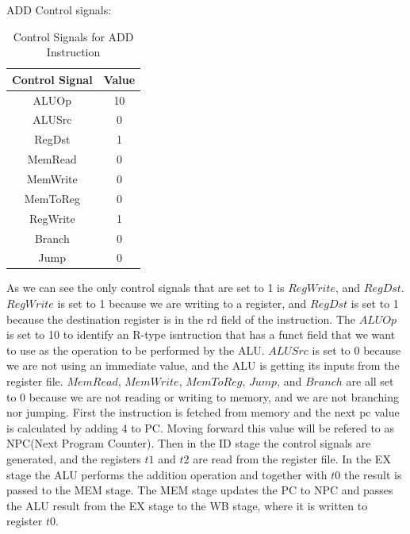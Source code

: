 ADD Control signals:
\begin{table}[H]
    \centering
    \begin{tabular}{|c|c|}
    \hline
    \textbf{Control Signal} & \textbf{Value} \\ \hline
    ALUOp                   & 10             \\ \hline
    ALUSrc                  & 0             \\ \hline
    RegDst                  & 1             \\ \hline
    MemRead                 & 0             \\ \hline
    MemWrite                & 0             \\ \hline
    MemToReg                & 0             \\ \hline
    RegWrite                & 1             \\ \hline
    Branch                  & 0             \\ \hline
    Jump                 & 0             \\ \hline
    \end{tabular}
    \caption{Control Signals for ADD Instruction}
    \label{tab:add_control_signals}
\end{table}

As we can see the only control signals that are set to 1 is $RegWrite$, and $RegDst$. $RegWrite$ is set to 1 because we are writing to a register, and $RegDst$ is set to 1 because the destination register is in the rd field of the instruction. The $ALUOp$ is set to 10 to identify an R-type isntruction that has a funct field that we want to use as the operation to be performed by the ALU. $ALUSrc$ is set to 0 because we are not using an immediate value, and the ALU is getting its inputs from the register file. $MemRead$, $MemWrite$, $MemToReg$, $Jump$, and $Branch$ are all set to 0 because we are not reading or writing to memory, and we are not branching nor jumping.
First the instruction is fetched from memory and the next pc value is calculated by adding 4 to PC. Moving forward this value will be refered to as NPC(Next Program Counter). Then in the ID stage the control signals are generated, and the registers $t1$ and $t2$ are read from the register file. In the EX stage the ALU performs the addition operation and together with $t0$ the result is passed to the MEM stage. The MEM stage updates the PC to NPC and passes the ALU result from the EX stage to the WB stage, where it is written to register $t0$.


